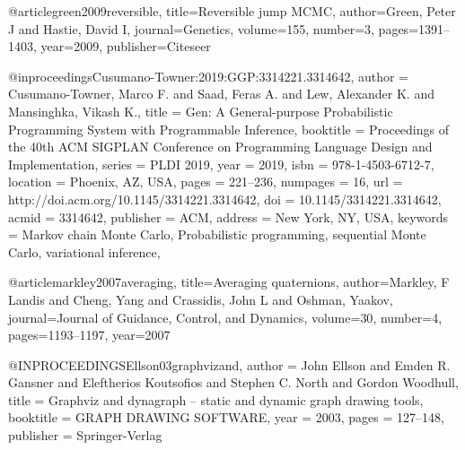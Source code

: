 \begin{singlespace}


\end{singlespace}


@article{green2009reversible,
  title={Reversible jump MCMC},
  author={Green, Peter J and Hastie, David I},
  journal={Genetics},
  volume={155},
  number={3},
  pages={1391--1403},
  year={2009},
  publisher={Citeseer}
}

@inproceedings{Cusumano-Towner:2019:GGP:3314221.3314642,
 author = {Cusumano-Towner, Marco F. and Saad, Feras A. and Lew, Alexander K. and Mansinghka, Vikash K.},
 title = {Gen: A General-purpose Probabilistic Programming System with Programmable Inference},
 booktitle = {Proceedings of the 40th ACM SIGPLAN Conference on Programming Language Design and Implementation},
 series = {PLDI 2019},
 year = {2019},
 isbn = {978-1-4503-6712-7},
 location = {Phoenix, AZ, USA},
 pages = {221--236},
 numpages = {16},
 url = {http://doi.acm.org/10.1145/3314221.3314642},
 doi = {10.1145/3314221.3314642},
 acmid = {3314642},
 publisher = {ACM},
 address = {New York, NY, USA},
 keywords = {Markov chain Monte Carlo, Probabilistic programming, sequential Monte Carlo, variational inference},
}



@article{markley2007averaging,
  title={Averaging quaternions},
  author={Markley, F Landis and Cheng, Yang and Crassidis, John L and Oshman, Yaakov},
  journal={Journal of Guidance, Control, and Dynamics},
  volume={30},
  number={4},
  pages={1193--1197},
  year={2007}
}

@INPROCEEDINGS{Ellson03graphvizand,
    author = {John Ellson and Emden R. Gansner and Eleftherios Koutsofios and Stephen C. North and Gordon Woodhull},
    title = {Graphviz and dynagraph – static and dynamic graph drawing tools},
    booktitle = {GRAPH DRAWING SOFTWARE},
    year = {2003},
    pages = {127--148},
    publisher = {Springer-Verlag}
}

